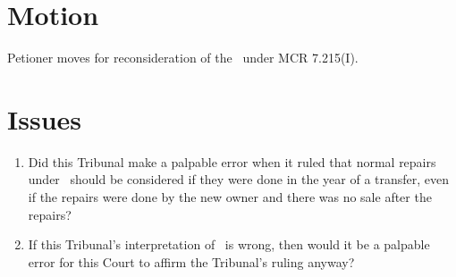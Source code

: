 \documentclass[12pt,\documentclassflag]{michiganCourtOfAppealsBrief}
\begin{document}
\section{Motion}






Petioner moves for reconsideration of the \cite{FOJ}\ under MCR 7.215(I).

\section{Issues}

\begin{enumerate}
  
\item Did this Tribunal make a palpable error when it ruled that normal repairs under \cite[s]{MCL 211.27(2)}\ should be considered if they were done in the year of a transfer, even if the repairs were done by the new owner and there was no sale after the repairs?
 
\item If this Tribunal's interpretation of \cite[s]{MCL 211.27(2)}\ is wrong, then would it be a palpable error for this Court to affirm the Tribunal's ruling anyway?
\end{enumerate}
\end{document}

